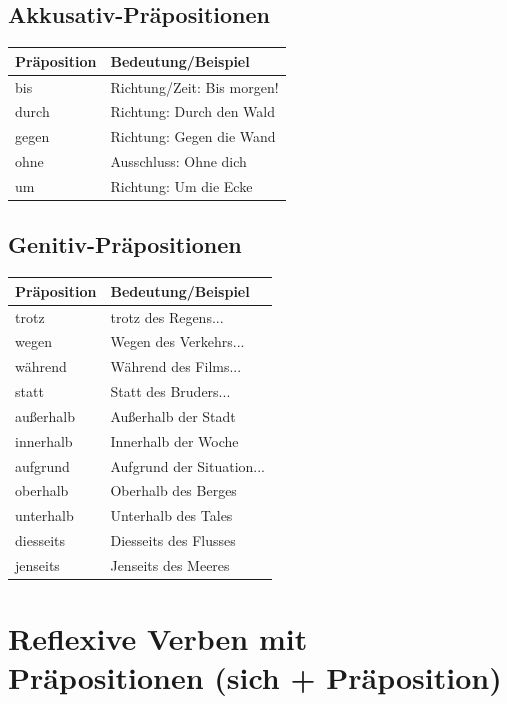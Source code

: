 \subsection{Akkusativ-Präpositionen}
\begin{center}
\begin{tabular}{|l|l|}
\hline
\textbf{Präposition} & \textbf{Bedeutung/Beispiel} \\ \hline
bis & Richtung/Zeit: Bis morgen! \\ \hline
durch & Richtung: Durch den Wald \\ \hline
gegen & Richtung: Gegen die Wand \\ \hline
ohne & Ausschluss: Ohne dich \\ \hline
um & Richtung: Um die Ecke \\ \hline
\end{tabular}
\end{center}

\subsection{Genitiv-Präpositionen}
\begin{center}
\begin{tabular}{|l|l|}
\hline
\textbf{Präposition} & \textbf{Bedeutung/Beispiel} \\ \hline
trotz & trotz des Regens... \\ \hline
wegen & Wegen des Verkehrs... \\ \hline
während & Während des Films... \\ \hline
statt & Statt des Bruders... \\ \hline
außerhalb & Außerhalb der Stadt \\ \hline
innerhalb & Innerhalb der Woche \\ \hline
aufgrund & Aufgrund der Situation... \\ \hline
oberhalb & Oberhalb des Berges \\ \hline
unterhalb & Unterhalb des Tales \\ \hline
diesseits & Diesseits des Flusses \\ \hline
jenseits & Jenseits des Meeres \\ \hline
\end{tabular}
\end{center}

\section{Reflexive Verben mit Präpositionen (sich + Präposition)}
\label{sec:ReflexivPraep}

